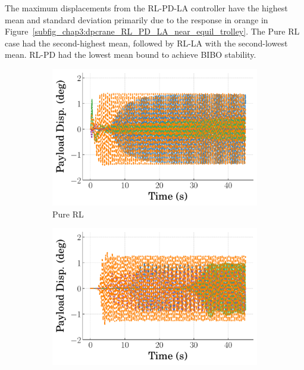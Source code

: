 %
The maximum displacements from the RL-PD-LA controller have the highest mean and standard deviation primarily due to the response in orange in Figure~\ref{subfig_chap3:dpcrane_RL_PD_LA_near_equil_trolley}. The Pure RL case had the second-highest mean, followed by RL-LA with the second-lowest mean. RL-PD had the lowest mean bound to achieve BIBO stability.
%
\begin{figure}[t]
  \centering
  \begin{subfigure}[b]{0.49\textwidth}
      \centering
      \includegraphics[width=\textwidth]{figures/figures_stability/time_responses_crane/dpcrane_pure_RL/Payload_displacement_0_init_300000_steps.pdf}
      \caption{Pure RL}
      \label{subfig_chap3:dpcrane_RL_alone_near_equil_payload}
  \end{subfigure}
  \hfill
  \begin{subfigure}[b]{0.49\textwidth}
    \centering
    \includegraphics[width=\textwidth]{figures/figures_stability/time_responses_crane/dpcrane_cont_gain_sched/Payload_displacement_0.0001_init_300000_steps.pdf}

\end{subfigure}
\end{figure}
